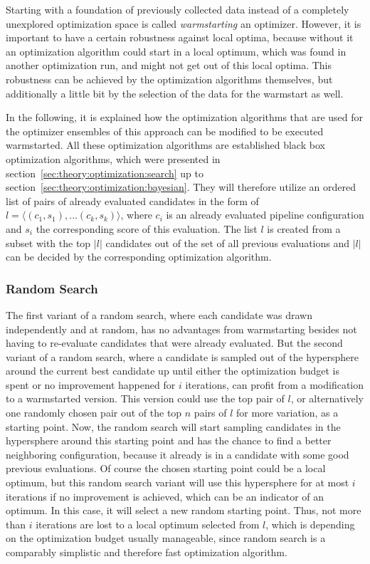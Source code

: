 Starting with a foundation of previously collected data instead of a completely unexplored optimization space is called \textit{warmstarting} an optimizer.
However, it is important to have a certain robustness against local optima, because without it an optimization algorithm could start in a local optimum, which was found in another optimization run, and might not get out of this local optima.
This robustness can be achieved by the optimization algorithms themselves, but additionally a little bit by the selection of the data for the warmstart as well.

In the following, it is explained how the optimization algorithms that are used for the optimizer ensembles of this approach can be modified to be executed warmstarted.
All these optimization algorithms are established black box optimization algorithms, which were presented in section~\ref{sec:theory:optimization:search} up to section~\ref{sec:theory:optimization:bayesian}.
They will therefore utilize an ordered list of pairs of already evaluated candidates in the form of $l = \langle (c_1, s_1), ... (c_k, s_k) \rangle$, where $c_i$ is an already evaluated pipeline configuration and $s_i$ the corresponding score of this evaluation.
The list $l$ is created from a subset with the top $|l|$ candidates out of the set of all previous evaluations and $|l|$ can be decided by the corresponding optimization algorithm.

\subsubsection{Random Search}
The first variant of a random search, where each candidate was drawn independently and at random, has no advantages from warmstarting besides not having to re-evaluate candidates that were already evaluated.\newline
But the second variant of a random search, where a candidate is sampled out of the hypersphere around the current best candidate up until either the optimization budget is spent or no improvement happened for $i$ iterations, can profit from a modification to a warmstarted version.
This version could use the top pair of $l$, or alternatively one randomly chosen pair  out of the top $n$ pairs of $l$ for more variation, as a starting point.\newline
Now, the random search will start sampling candidates in the hypersphere around this starting point and has the chance to find a better neighboring configuration, because it already is in a candidate with some good previous evaluations.\newline
Of course the chosen starting point could be a local optimum, but this random search variant will use this hypersphere for at most $i$ iterations if no improvement is achieved, which can be an indicator of an optimum.
In this case, it will select a new random starting point.
Thus, not more than $i$ iterations are lost to a local optimum selected from $l$, which is depending on the optimization budget usually manageable, since random search is a comparably simplistic and therefore fast optimization algorithm.

